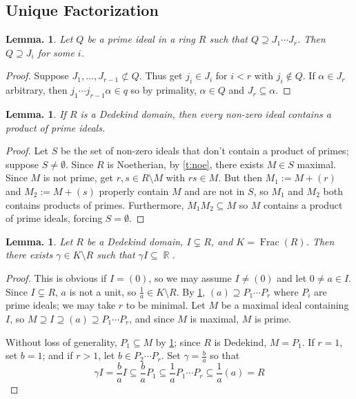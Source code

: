 \documentclass[11pt, a4paper]{memoir}
\DeclareMathOperator{\R}{{\mathbb{R}}}
\theoremstyle{change}
\newtheorem{lemma}[theorem]{Lemma.}
\theoremstyle{plain}
\theoremstyle{nonumberplain}
\newtheorem{proof}{Proof}
\DeclareMathOperator{\Frac}{Frac}
\numberwithin{equation}{section}
\begin{document}
\subsection{Unique Factorization}
\begin{lemma}\label{l:id-cont}
    Let $Q$ be a prime ideal in a ring $R$ such that $Q\supseteq J_1\cdots J_r$.
    Then $Q\supseteq J_i$ for some $i$.
\end{lemma}
\begin{proof}
    Suppose $J_1,\ldots,J_{r-1}\not\subset Q$.
    Thus get $j_i\in J_i$ for $i<r$ with $j_i\notin Q$.
    If $\alpha\in J_r$ arbitrary, then $j_1\cdots j_{r-1}\alpha\in q$ so by primality, $\alpha\in Q$ and $J_r\subseteq\alpha$.
\end{proof}
\begin{lemma}\label{l:prod-id}
    If $R$ is a Dedekind domain, then every non-zero ideal contains a product of prime ideals.
\end{lemma}
\begin{proof}
    Let $S$ be the set of non-zero ideals that don't contain a product of primes; suppose $S\neq\emptyset$.
    Since $R$ is Noetherian, by \cref{t:noe}, there exists $M\in S$ maximal.
    Since $M$ is not prime, get $r,s\in R\setminus M$ with $rs\in M$.
    But then $M_1:=M+(r)$ and $M_2:=M+(s)$ properly contain $M$ and are not in $S$, so $M_1$ and $M_2$ both contains products of primes.
    Furthermore, $M_1M_2\subseteq M$ so $M$ contains a product of prime ideals, forcing $S=\emptyset$.
\end{proof}
\begin{lemma}\label{l:id-frac}
    Let $R$ be a Dedekind domain, $I\subsetneq R$, and $K=\Frac(R)$.
    Then there exists $\gamma\in K\setminus R$ such that $\gamma I\subseteq\R$.
\end{lemma}
\begin{proof}
    This is obvious if $I=(0)$, so we may assume $I\neq(0)$ and let $0\neq a\in I$.
    Since $I\subsetneq R$, $a$ is not a unit, so $\frac{1}{a}\in K\setminus R$.
    By \cref{l:prod-id}, $(a)\supseteq P_1\cdots P_r$ where $P_i$ are prime ideals; we may take $r$ to be minimal.
    Let $M$ be a maximal ideal containing $I$, so $M\supseteq I\supseteq(a)\supseteq P_1\cdots P_r$, and since $M$ is maximal, $M$ is prime.

    Without loss of generality, $P_1\subseteq M$ by \cref{l:id-cont}; since $R$ is Dedekind, $M=P_1$.
    If $r=1$, set $b=1$; and if $r>1$, let $b\in P_2\cdots P_r$.
    Set $\gamma=\frac{b}{a}$ so that
    \begin{equation*}
        \gamma I=\frac{b}{a}I\subseteq\frac{b}{a}P_1\subseteq\frac{1}{a}P_1\cdots P_r\subseteq\frac{1}{a}(a)=R
    \end{equation*}
\end{proof}
\end{document}
